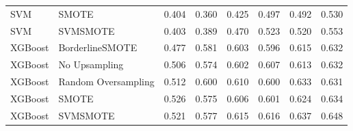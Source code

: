 \begin{tabular}{llllllll}
                            SVM &                         SMOTE & 0.404 &                     0.360 &                 0.425 &                  0.497 &                                   0.492 &     0.530 \\
                            SVM &                      SVMSMOTE & 0.403 &                     0.389 &                 0.470 &                  0.523 &                                   0.520 &     0.553 \\
                        XGBoost &               BorderlineSMOTE & 0.477 &                     0.581 &                 0.603 &                  0.596 &                                   0.615 &     0.632 \\
                        XGBoost &                 No Upsampling & 0.506 &                     0.574 &                 0.602 &                  0.607 &                                   0.613 &     0.632 \\
                        XGBoost &           Random Oversampling & 0.512 &                     0.600 &                 0.610 &                  0.600 &                                   0.633 &     0.631 \\
                        XGBoost &                         SMOTE & 0.526 &                     0.575 &                 0.606 &                  0.601 &                                   0.624 &     0.634 \\
                        XGBoost &                      SVMSMOTE & 0.521 &                     0.577 &                 0.615 &                  0.616 &                                   0.637 &     0.648 \\
\bottomrule
\end{tabular}
